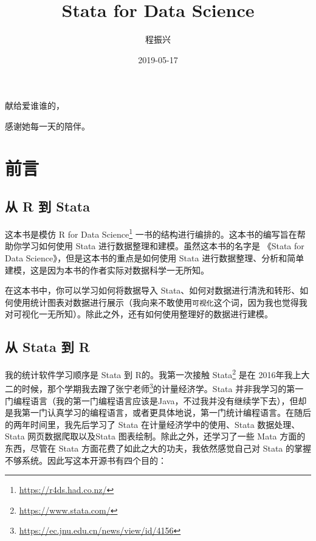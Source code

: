 \documentclass[]{ctexbook}
\title{Stata for Data Science}
\author{程振兴}
\date{2019-05-17}
\renewcommand{\href}[2]{#2\footnote{\url{#1}}}
\begin{document}
\maketitle


\thispagestyle{empty}

\begin{center}
献给爱谁谁的，

感谢她每一天的陪伴。
\end{center}

\setlength{\abovedisplayskip}{-5pt}
\setlength{\abovedisplayshortskip}{-5pt}

{
\setcounter{tocdepth}{1}
\tableofcontents
}
\listoftables
\listoffigures
\hypertarget{section}{%
\chapter{前言}\label{section}}

\hypertarget{r--stata}{%
\section{从 R 到 Stata}\label{r--stata}}

这本书是模仿 \href{https://r4ds.had.co.nz/}{R for Data Science} 一书的结构进行编排的。这本书的编写旨在帮助你学习如何使用 Stata 进行数据整理和建模。虽然这本书的名字是 《Stata for Data Science》，但是这本书的重点是如何使用 Stata 进行数据整理、分析和简单建模，这是因为本书的作者实际对数据科学一无所知。

在这本书中，你可以学习如何将数据导入 Stata、如何对数据进行清洗和转形、如何使用统计图表对数据进行展示（我向来不敢使用\texttt{可视化}这个词，因为我也觉得我对可视化一无所知）。除此之外，还有如何使用整理好的数据进行建模。

\hypertarget{stata--r}{%
\section{从 Stata 到 R}\label{stata--r}}

我的统计软件学习顺序是 Stata 到 R的。我第一次接触 \href{https://www.stata.com/}{Stata} 是在 2016年我上大二的时候，那个学期我去蹭了\href{https://ec.jnu.edu.cn/news/view/id/4156}{张宁老师}的计量经济学。Stata 并非我学习的第一门编程语言（我的第一门编程语言应该是Java，不过我并没有继续学下去），但却是我第一门认真学习的编程语言，或者更具体地说，第一门统计编程语言。在随后的两年时间里，我先后学习了 Stata 在计量经济学中的使用、Stata 数据处理、Stata 网页数据爬取以及Stata 图表绘制。除此之外，还学习了一些 Mata 方面的东西，尽管在 Stata 方面花费了如此之大的功夫，我依然感觉自己对 Stata 的掌握不够系统。因此写这本开源书有四个目的：
\end{document}

